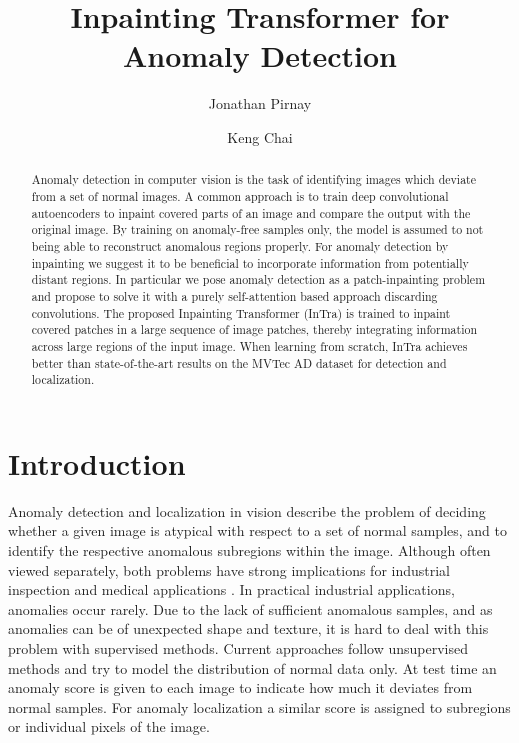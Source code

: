 \documentclass[final,5p,times,twocolumn]{elsarticle}
\begin{document}
	
	\renewcommand{\vec}[1]{\boldsymbol{\mathrm{#1}}}
	
	\begin{frontmatter}
		




		\title{Inpainting Transformer for Anomaly Detection}
		


		\author[fujitsu]{Jonathan Pirnay}
		\author[fujitsu]{Keng Chai}
		\address[fujitsu]{Digital Incubation, Fujitsu Technology Solutions GmbH, Germany}


		\begin{abstract}
Anomaly detection in computer vision is the task of identifying images which deviate from a set of normal images. A common approach is to train deep convolutional autoencoders to inpaint covered parts of an image and compare the output with the original image. By training on anomaly-free samples only, the model is assumed to not being able to reconstruct anomalous regions properly. For anomaly detection by inpainting we suggest it to be beneficial to incorporate information from potentially distant regions. In particular we pose anomaly detection as a patch-inpainting problem and propose to solve it with a purely self-attention based approach discarding convolutions. The proposed Inpainting Transformer (InTra) is trained to inpaint covered patches in a large sequence of image patches, thereby integrating information across large regions of the input image. When learning from scratch, InTra achieves better than state-of-the-art results on the MVTec AD \cite{MvtecAd2019} dataset for detection and localization.
		\end{abstract}
		
	\end{frontmatter}
	


\section{Introduction}
	\label{section:introduction}
	
	Anomaly detection and localization in vision describe the problem of deciding whether a given image is atypical with respect to a set of normal samples, and to identify the respective anomalous subregions within the image. Although often viewed separately, both problems have strong implications for industrial inspection \cite{MvtecAd2019} and medical applications \cite{fernando2020deep}. In practical industrial applications, anomalies occur rarely. Due to the lack of sufficient anomalous samples, and as anomalies can be of unexpected shape and texture, it is hard to deal with this problem with supervised methods. Current approaches follow unsupervised methods and try to model the distribution of normal data only. At test time an anomaly score is given to each image to indicate how much it deviates from normal samples. For anomaly localization a similar score is assigned to subregions or individual pixels of the image.
	
\end{document}
